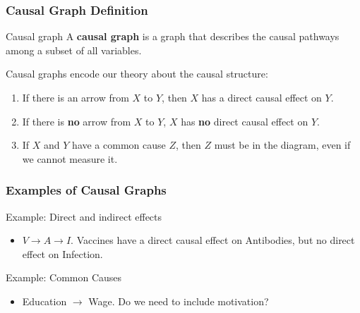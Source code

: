 \documentclass[12pt, block=fill]{beamer}
\begin{document}
\begin{frame}
  \frametitle{Causal Graph Definition}

  \begin{block}{Causal graph}
    A \textbf{causal graph} is a graph that describes the causal
    pathways among a subset of all variables.
  \end{block}

  Causal graphs encode our theory about the causal structure: 
  

  \begin{enumerate}
  \item If there is an arrow from $X$ to $Y$, then $X$ has a direct
    causal effect on $Y$. 
  \item If there is \textbf{no} arrow from $X$ to $Y$, $X$ has
    \textbf{no} direct causal effect on $Y$. 
  \item If $X$ and $Y$ have a common cause $Z$, then $Z$ must be in
    the diagram, even if we cannot measure it.
  \end{enumerate}
\end{frame}
  
\begin{frame}
  \frametitle{Examples of Causal Graphs}
  \begin{block}{Example: Direct and indirect effects}
    \begin{itemize}
    \item $V \rightarrow A \rightarrow I$.  Vaccines have a direct
      causal effect on Antibodies, but no direct effect on
      Infection. 
    \end{itemize}    
  \end{block}
  \vspace{1em}
  \begin{block}{Example: Common Causes}
    \begin{itemize}
    \item Education $\rightarrow$ Wage.  Do we need to include motivation?
    \end{itemize}
  \end{block} 
\end{frame}
\end{document}
